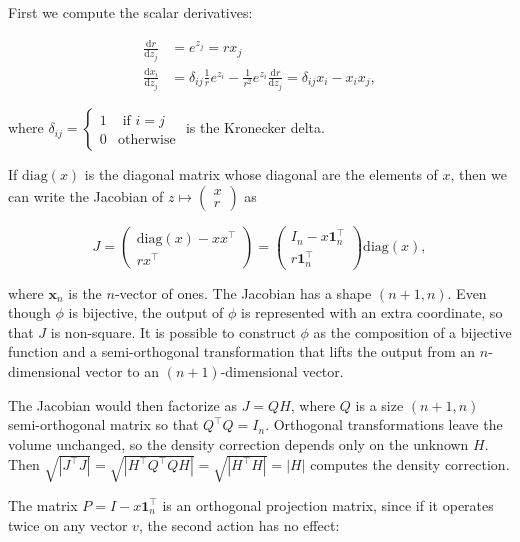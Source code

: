 \documentclass[twoside]{article}
\begin{document}
First we compute the scalar derivatives:

$$
\begin{aligned}
    \frac{\mathrm{d} r}{\mathrm{d} z_j} &= e^{z_j} = r x_j\\
    \frac{\mathrm{d} x_i}{\mathrm{d} z_j} &= \delta_{ij} \frac{1}{r} e^{z_i} - \frac{1}{r^2} e^{z_i} \frac{\mathrm{d} r}{\mathrm{d} z_j} = \delta_{ij} x_i - x_i x_j,
\end{aligned}
$$

where $\delta_{ij} = \begin{cases} 1 &\text{ if } i = j \\ 0 &\text{otherwise}\end{cases}$ is the Kronecker delta.

If $\mathrm{diag}(x)$ is the diagonal matrix whose diagonal are the elements of $x$, then we can write the Jacobian of $z \mapsto \begin{pmatrix}x \\ r \end{pmatrix}$ as

$$J = \begin{pmatrix}\mathrm{diag}(x) - x x^\top \\ r x^\top\end{pmatrix} = \begin{pmatrix}I_n - x \boldsymbol{1}_n^\top \\ r \boldsymbol{1}_n^\top \end{pmatrix} \mathrm{diag}(x),$$

where $\boldsymbol{x}_n$ is the $n$-vector of ones.
The Jacobian has a shape $(n+1,n)$.
Even though $\phi$ is bijective, the output of $\phi$ is represented with an extra coordinate, so that $J$ is non-square.
It is possible to construct $\phi$ as the composition of a bijective function and a semi-orthogonal transformation that lifts the output from an $n$-dimensional vector to an $(n+1)$-dimensional vector.

The Jacobian would then factorize as $J = Q H$, where $Q$ is a size $(n+1,n)$ semi-orthogonal matrix so that $Q^\top Q = I_n$.
Orthogonal transformations leave the volume unchanged, so the density correction depends only on the unknown $H$.
Then $\sqrt{|J^\top J|} = \sqrt{|H^\top Q^\top Q H|} = \sqrt{|H^\top H|} = |H|$ computes the density correction.

The matrix $P = I - x \boldsymbol{1}^\top_n$ is an orthogonal projection matrix, since if it operates twice on any vector $v$, the second action has no effect:
\end{document}
